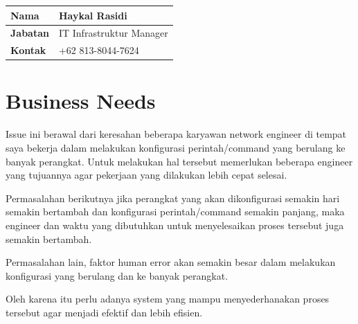 \begin{table}[h!]
    \centering
    \begin{tabular}{|l|l|}
        \hline
        \textbf{Nama} & Haykal Rasidi \\ \hline
        \textbf{Jabatan} & IT Infrastruktur Manager \\ \hline
        \textbf{Kontak} & +62 813-8044-7624 \\ \hline
    \end{tabular}
\end{table}

\section{Business Needs}

Issue ini berawal dari keresahan beberapa karyawan network engineer di tempat saya bekerja dalam melakukan konfigurasi perintah/command yang berulang ke banyak perangkat. Untuk melakukan hal tersebut memerlukan beberapa engineer yang tujuannya agar pekerjaan yang dilakukan lebih cepat selesai. 

Permasalahan berikutnya jika perangkat yang akan dikonfigurasi semakin hari semakin bertambah dan konfigurasi perintah/command semakin panjang, maka engineer dan waktu yang dibutuhkan untuk menyelesaikan proses tersebut juga semakin bertambah.  

Permasalahan lain, faktor human error akan semakin besar dalam melakukan konfigurasi yang berulang dan ke banyak perangkat. 

Oleh karena itu perlu adanya system yang mampu menyederhanakan proses tersebut agar menjadi efektif dan lebih efisien. 

